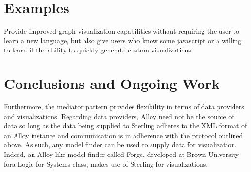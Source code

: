 \documentclass[runningheads]{llncs}
\begin{document}

\section{Examples}

Provide improved graph visualization capabilities without requiring the user to learn a new language, but also give users who know some javascript or a willing to learn it the ability to quickly generate custom visualizations.

\section{Conclusions and Ongoing Work}
\label{conclusions}

Furthermore, the mediator pattern provides flexibility in terms of data providers and visualizations. Regarding data providers, Alloy need not be the source of data so long as the data being supplied to Sterling adheres to the XML format of an Alloy instance and communication is in adherence with the protocol outlined above. As such, any model finder can be used to supply data for visualization. Indeed, an Alloy-like model finder called Forge, developed at Brown University fora Logic for Systems class, makes use of Sterling for visualizations.



\end{document}
